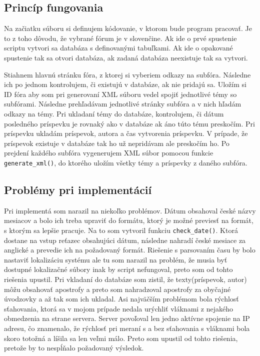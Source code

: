 \documentclass[11pt, a4paper, titlepage] {article}
\begin{document}
\subsection{Princíp fungovania}
Na začiatku súboru si definujem kódovanie, v ktorom bude program pracovať. Je to z toho dôvodu, že vybrané fórum je v slovenčine. Ak ide o prvé spustenie scriptu vytvori sa databáza s definovanými tabuľkami. Ak ide o opakované spustenie tak sa otvori databáza, ak zadaná databáza neexistuje tak sa vytvori. 

Stiahnem hlavnú stránku fóra, z ktorej si vyberiem odkazy na subfóra. Následne ich po jednom kontrolujem, či existujú v databáze, ak nie pridajú sa. Uložím si ID fóra aby som pri generovaní XML súboru vedel spojiť jednotlivé témy so subfórami. Následne prehľadávam jednotlivé stránky subfóra a v nich hľadám odkazy na témy. Pri ukladaní témy do databáze, kontrolujem, či dátum posledného príspevku je rovnaký ako v databáze ak áno túto tému preskočím. Pri príspevku ukladám príspevok, autora a čas vytvorenia príspevku. V prípade, že príspevok existuje v databáze tak ho už nepridávam ale preskočím ho. Po prejdení každého subfóra vygenerujem XML súbor pomocou funkcie \verb|generate_xml()|, do ktorého uložím všetky témy a príspevky z daného subfóra. 

\subsection{Problémy pri implementácií}
Pri implementá som narazil na niekoľko problémov. Dátum obsahoval české názvy mesiacov a bolo ich treba upraviť do formátu, ktorý je možné previesť na formát, s ktorým sa lepšie pracuje. Na to som vytvoril funkciu \verb|check_date()|. Ktorá dostane na vstup reťazec obsahujúci dátum, následne nahradí české mesiace za anglické a prevedie ich na požadovaný formát. Riešenie s parsovaním času by bolo nastaviť lokalizáciu systému ale tu som narazil na problém, že musia byť dostupné lokalizačné súbory inak by script nefungoval, preto som od tohto riešenia upustil. Pri vkladaní do databáze som zistil, že texty(príspevok, autor) môžu obsahovať apostrofy a preto som nahradzoval apostrofy za obyčajné úvodzovky a až tak som ich ukladal. Asi najväčším problémom bola rýchlosť sťahovania, ktorá sa v mojom prípade nedala urýchliť vláknami z nejakého obmedzenia na strane servera. Server povoľoval len jedno aktívne spojenie na IP adresu, čo znamenalo, že rýchlosť pri meraní s a bez sťahovania s vláknami bola skoro totožná a líšila sa len veľmi málo. Preto som upustil od tohto riešenia, pretože by to nespĺňalo požadovaný výsledok.
\end{document}
